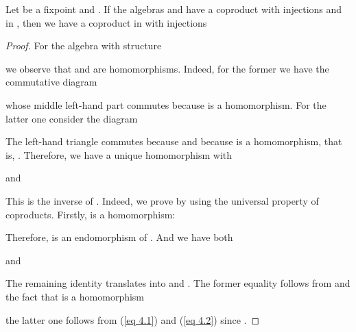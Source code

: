 \documentclass{LMCS}
\theoremstyle{plain}
\theoremstyle{definition}
\numberwithin{equation}{section}
\begin{document}
\begin{defi}
\begin{lem}\label{fixed point lemma}
Let  be a fixpoint and . If the algebras  and  have a coproduct  with injections  and  in , then we have a coproduct  in  with injections

\end{lem}

\begin{proof}
For the algebra  with structure

we observe that  and   are homomorphisms.
Indeed, for the former we have the commutative diagram

whose middle left-hand part commutes because  is a homomorphism. For the latter one consider the diagram

The left-hand triangle commutes because  and because  is a homomorphism, that is, . Therefore, we have a unique homomorphism  with

and

This is the inverse of . Indeed, we prove  by using the universal property of coproducts. Firstly,  is a homomorphism:

Therefore,  is an endomorphism of . And we have both

and

The remaining identity  translates into  and . The former equality follows from  and the fact that  is a homomorphism

the latter one follows from (\ref{eq 4.1}) and (\ref{eq 4.2}) since .
\end{proof}


\end{defi}
\end{document}
